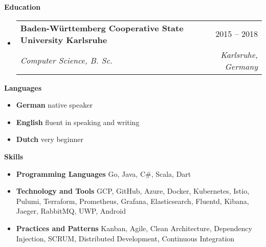 \documentclass[letterpaper,12pt]{article}
\makeatletter
\renewcommand{\section}[2]{\vspace{5pt}
  \colorbox{teriary}{\color{white}\raggedbottom\normalsize\textbf{{#1}{\hspace{7pt}#2}}}
}
\newcommand{\resumeEntryStart}{\vspace{0.5\baselineskip}\begin{minipage}{\textwidth}\begin{itemize}[leftmargin=2.5mm]}
\newcommand{\resumeEntryEnd}{\end{itemize}\end{minipage}\vspace{1\baselineskip}}
\newcommand{\resumeEntryTSDL}[4]{
  \vspace{-1pt}\item[]
    \begin{tabularx}{0.97\textwidth}{X@{\hspace{60pt}}r}
      \textbf{\color{primary}#1} & {\color{accent}\small#2} \\
      \textit{\color{accent}\small#3} & \textit{\color{accent}\small#4} \\
    \end{tabularx}\vspace{-6pt}
}
\newcommand{\resumeEntryS}[2]{
  \item[]\small{
    \textbf{\color{primary}#1 }{ #2 \vspace{-6pt}}
  }
}
\makeatother
\begin{document}
\section{\faGraduationCap}{Education}

\resumeEntryStart
  \resumeEntryTSDL
    {Baden-Württemberg Cooperative State University Karlsruhe}{2015 -- 2018}
    {Computer Science, B. Sc.}{Karlsruhe, Germany}
\resumeEntryEnd

\section{\faCommentDots}{Languages}

\resumeEntryStart
  \resumeEntryS{German} {native speaker}
  \resumeEntryS{English} {fluent in speaking and writing}
  \resumeEntryS{Dutch} {very beginner}
\resumeEntryEnd


\section{}{Skills}

\resumeEntryStart
  \resumeEntryS{Programming Languages} {Go, Java, C\#, Scala, Dart}
  \resumeEntryS{Technology and Tools} {GCP, GitHub, Azure, Docker, Kubernetes, Istio, Pulumi, Terraform, Prometheus, Grafana, Elasticsearch, Fluentd, Kibana, Jaeger, RabbitMQ, UWP, Android}
  \resumeEntryS{Practices and Patterns} {Kanban, Agile, Clean Architecture, Dependency Injection, SCRUM, Distributed Development, Continuous Integration}
\resumeEntryEnd
\end{document}
